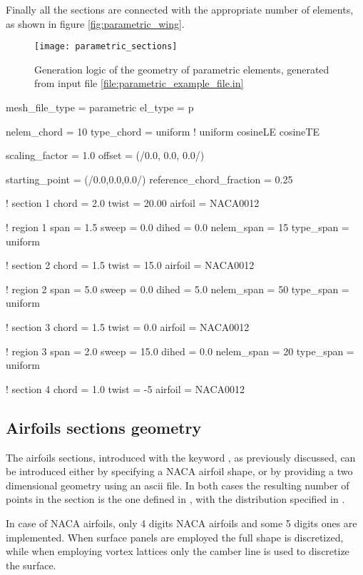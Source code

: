 Finally all the sections are connected with the appropriate number of elements, as shown in figure \ref{fig:parametric_wing}.

\begin{figure}[h]
\centering
\texttt{[image: parametric\_sections]}
\caption{Generation logic of the geometry of parametric elements, generated from input file \ref{file:parametric_example_file.in}}
\label{fig:parametric_sections}
\end{figure}

\begin{inputfile}[frame=single, caption={Parametric geometry for figure \ref{fig:parametric_sections}}, label={file:parametric_example_file.in}]
mesh_file_type = parametric
el_type = p

nelem_chord = 10
type_chord = uniform   ! uniform  cosineLE  cosineTE

scaling_factor = 1.0
offset = (/0.0, 0.0, 0.0/)

starting_point = (/0.0,0.0,0.0/)
reference_chord_fraction = 0.25

! section 1
chord = 2.0
twist = 20.00
airfoil = NACA0012

! region  1
span = 1.5
sweep = 0.0
dihed = 0.0
nelem_span = 15
type_span = uniform

! section 2
chord = 1.5
twist = 15.0
airfoil = NACA0012

! region  2
span = 5.0
sweep = 0.0
dihed = 5.0
nelem_span = 50
type_span = uniform

! section 3
chord = 1.5
twist = 0.0
airfoil = NACA0012

! region  3
span = 2.0
sweep = 15.0
dihed = 0.0
nelem_span = 20
type_span = uniform

! section 4
chord = 1.0
twist = -5
airfoil = NACA0012
\end{inputfile}


\subsection{Airfoils sections geometry}
The airfoils sections, introduced with the keyword , as previously discussed, 
can be introduced either by specifying a NACA airfoil shape, or by providing a two dimensional 
geometry using an ascii file. In both cases the resulting number of points in the section is the 
one defined in , with the distribution specified in . 

In case of NACA airfoils, only 4 digits NACA airfoils and some 5 digits ones are implemented. 
When surface panels are employed the full shape is discretized, while when employing vortex 
lattices only the camber line is used to discretize the surface. 

